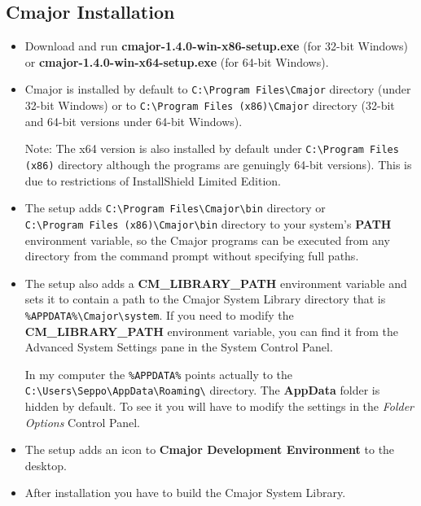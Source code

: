 \documentclass[oneside, a4paper, 11pt]{article}
\begin{document}
\subsection{Cmajor Installation}

\begin{itemize}

\item
Download and run \textbf{cmajor-1.4.0-win-x86-setup.exe} (for 32-bit Windows) or
\textbf{cmajor-1.4.0-win-x64-setup.exe} (for 64-bit Windows).

\item
Cmajor is installed by default to \verb|C:\Program Files\Cmajor| directory (under 32-bit Windows) or
to \verb|C:\Program Files (x86)\Cmajor| directory (32-bit and 64-bit versions under 64-bit Windows).

Note: The x64 version is also installed by default under
\verb|C:\Program Files (x86)| directory although the programs are genuingly 64-bit versions).
This is due to restrictions of InstallShield Limited Edition.

\item
The setup adds \verb|C:\Program Files\Cmajor\bin| directory or \\
\verb|C:\Program Files (x86)\Cmajor\bin| directory
to your system's \textbf{PATH} environment variable, so the Cmajor programs can be executed from any
directory from the command prompt without specifying full paths.

\item
The setup also adds a \textbf{CM\_LIBRARY\_PATH} environment variable and
sets it to contain a path to the Cmajor System Library directory
that is \verb|%APPDATA%\Cmajor\system|. If you need to modify the
\textbf{CM\_LIBRARY\_PATH} environment variable, you can find it from the Advanced System Settings pane in the System Control Panel.

In my computer the \verb|%APPDATA%| points actually to the
\verb|C:\Users\Seppo\AppData\Roaming\| directory. The \textbf{AppData} folder
is hidden by default. To see it you will have to modify the settings in
the \emph{Folder Options} Control Panel.

\item
The setup adds an icon to \textbf{Cmajor Development Environment} to the desktop.

\item
After installation you have to build the Cmajor System Library.

\end{itemize}
\end{document}
